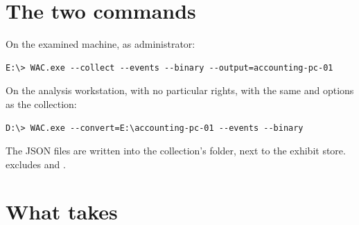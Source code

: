 \documentclass[11pt,a4paper,oneside]{report}
\begin{document}
\section{The two commands}

On the examined machine, as administrator:
\begin{lstlisting}
E:\> WAC.exe --collect --events --binary --output=accounting-pc-01
\end{lstlisting}

On the analysis workstation, with no particular rights, with the same
 and  options as the collection:
\begin{lstlisting}
D:\> WAC.exe --convert=E:\accounting-pc-01 --events --binary
\end{lstlisting}

The JSON files are written into the collection's folder, next to the exhibit
store.  excludes  and .

\section{What  takes}
\end{document}

